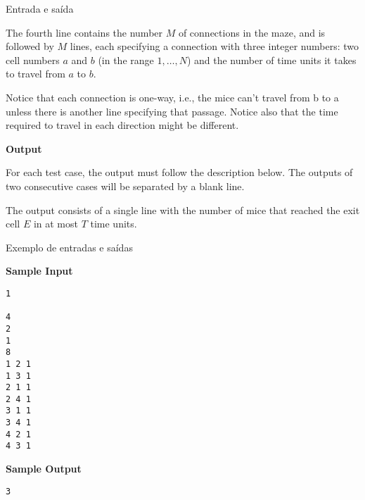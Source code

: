 \begin{frame}[fragile]{Entrada e saída}

The fourth line contains the number $M$ of connections in the maze, and is followed by $M$ lines, 
each specifying a connection with three integer numbers: two cell numbers $a$ and $b$ (in the range 
$1, \ldots, N$) and the number of time units it takes to travel from $a$ to $b$.

Notice that each connection is one-way, i.e., the mice can’t travel from b to a unless there is 
another line specifying that passage. Notice also that the time required to travel in each 
direction might be different.

\textbf{Output}

For each test case, the output must follow the description below. The outputs of two consecutive 
cases will be separated by a blank line.

The output consists of a single line with the number of mice that reached the exit cell $E$ in at 
most $T$ time units.

\end{frame}

\begin{frame}[fragile]{Exemplo de entradas e saídas}
\begin{minipage}[t]{0.6\textwidth}
\textbf{Sample Input}
\begin{verbatim}
1

4
2
1
8
1 2 1
1 3 1
2 1 1
2 4 1
3 1 1
3 4 1
4 2 1
4 3 1
\end{verbatim}
\end{minipage}
\begin{minipage}[t]{0.35\textwidth}
\textbf{Sample Output}
\begin{verbatim}
3
\end{verbatim}
\end{minipage}
\end{frame}

